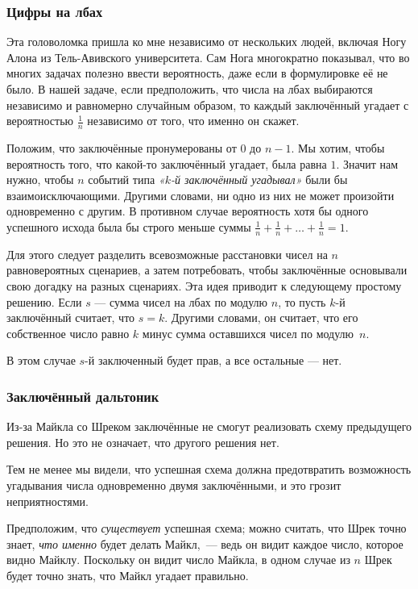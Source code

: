 \subsubsection*{Цифры на лбах}

Эта головоломка пришла ко мне независимо от нескольких людей, включая Ногу Алона из Тель-Авивского университета.
Сам Нога многократно показывал, что во многих задачах полезно ввести вероятность, даже если в формулировке её не было.
В нашей задаче, если предположить, что числа на лбах выбираются независимо и равномерно случайным образом, то каждый заключённый угадает с вероятностью $\tfrac{1}{n}$ независимо от того, что именно он скажет.

Положим, что заключённые пронумерованы от $0$ до $n-1$.
Мы хотим, чтобы вероятность того, что какой-то заключённый угадает, была равна $1$.
Значит нам нужно, чтобы $n$ событий типа \emph{«$k$-й заключённый угадывал»} были бы взаимоисключающими.
Другими словами, ни одно из них не может произойти одновременно с другим.
В противном случае вероятность хотя бы одного успешного исхода была бы строго меньше суммы $\tfrac1n + \tfrac1n + \dots + \tfrac1n = 1$.

Для этого следует разделить всевозможные расстановки чисел на $n$ равновероятных сценариев, а затем потребовать, чтобы заключённые основывали свою догадку на разных сценариях.
Эта идея приводит к следующему простому решению.
Если $s$ --- сумма чисел на лбах по модулю $n$, то пусть $k$-й заключённый считает, что $s = k$.
Другими словами, он считает, что его собственное число равно $k$ минус сумма оставшихся чисел по модулю~$n$.

В этом случае $s$-й заключенный будет прав, а все остальные --- нет.

\subsubsection*{Заключённый дальтоник}

Из-за Майкла со Шреком заключённые не смогут реализовать схему  предыдущего решения.
Но это не означает, что другого решения нет.

Тем не менее мы видели, что успешная схема должна предотвратить возможность угадывания числа одновременно двумя заключёнными, и это грозит неприятностями.

Предположим, что \emph{существует} успешная схема; можно считать, что Шрек точно знает,  \emph{что именно} будет делать Майкл,~---
ведь он видит каждое число, которое видно Майклу.
Поскольку он видит число Майкла, в одном случае из $n$ Шрек будет точно знать, что Майкл угадает правильно.

